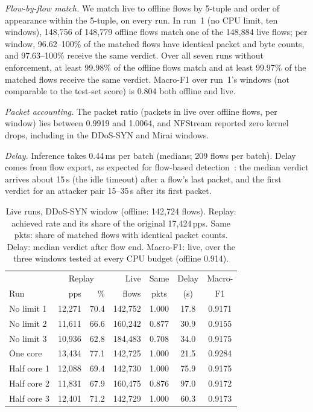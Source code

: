 \emph{Flow-by-flow match.} We match live to offline flows by 5-tuple and order of appearance within the 5-tuple, on every run. In run~1 (no CPU limit, ten windows), 148,756 of 148,779 offline flows match one of the 148,884 live flows; per window, 96.62--100\% of the matched flows have identical packet and byte counts, and 97.63--100\% receive the same verdict. Over all seven runs without enforcement, at least 99.98\% of the offline flows match and at least 99.97\% of the matched flows receive the same verdict. Macro-F1 over run~1's windows (not comparable to the test-set score) is 0.804 both offline and live.

\emph{Packet accounting.} The packet ratio (packets in live over offline flows, per window) lies between 0.9919 and 1.0064, and NFStream reported zero kernel drops, including in the DDoS-SYN and Mirai windows.

\emph{Delay.} Inference takes 0.44\,ms per batch (medians; 209 flows per batch). Delay comes from flow export, as expected for flow-based detection~\cite{hofstede2013realtime}: the median verdict arrives about 15\,s (the idle timeout) after a flow's last packet, and the first verdict for an attacker pair 15--35\,s after its first packet.

\begin{table}[t]
\centering
\caption{Live runs, DDoS-SYN window (offline: 142,724 flows). Replay: achieved rate and its share of the original 17,424\,pps. Same pkts: share of matched flows with identical packet counts. Delay: median verdict after flow end. Macro-F1: live, over the three windows tested at every CPU budget (offline 0.914).}
\label{tab:repeats}
\footnotesize
\setlength{\tabcolsep}{2.5pt}
\begin{tabular}{lrrrccc}
\hline
 & \multicolumn{2}{c}{Replay} & Live & Same & Delay & Macro- \\
Run & pps & \% & flows & pkts & (s) & F1 \\
\hline
No limit 1  & 12,271 & 70.4 & 142,752 & 1.000 & 17.8 & 0.9171 \\
No limit 2  & 11,611 & 66.6 & 160,242 & 0.877 & 30.9 & 0.9155 \\
No limit 3  & 10,936 & 62.8 & 184,483 & 0.708 & 34.0 & 0.9175 \\
One core    & 13,434 & 77.1 & 142,725 & 1.000 & 21.5 & 0.9284 \\
Half core 1 & 12,088 & 69.4 & 142,730 & 1.000 & 75.9 & 0.9175 \\
Half core 2 & 11,831 & 67.9 & 160,475 & 0.876 & 97.0 & 0.9172 \\
Half core 3 & 12,401 & 71.2 & 142,729 & 1.000 & 60.3 & 0.9173 \\
\hline
\end{tabular}
\end{table}

